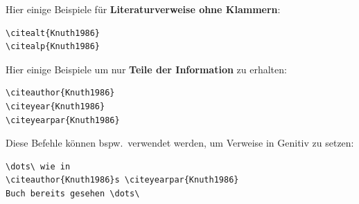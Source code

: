 \begin{frame}[fragile]

\noindent Hier einige Beispiele für \textbf{Literaturverweise ohne Klammern}:

\begin{multicols}{2}
\begin{lstlisting}
\citealt{Knuth1986}
\citealp{Knuth1986}
\end{lstlisting}
\citealt{Knuth1986}\newline
\citealp{Knuth1986}
\end{multicols}


\pause 


\noindent Hier einige Beispiele um nur \textbf{Teile der Information} zu erhalten:

\begin{multicols}{2}
\begin{lstlisting}
\citeauthor{Knuth1986}
\citeyear{Knuth1986}
\citeyearpar{Knuth1986}
\end{lstlisting}
\citeauthor{Knuth1986}\newline
\citeyear{Knuth1986}\newline
\citeyearpar{Knuth1986}
\end{multicols}

\end{frame}


\begin{frame}[fragile]

\noindent Diese Befehle können bspw.\ verwendet werden, um Verweise in Genitiv zu setzen:

\begin{lstlisting}
\dots\ wie in 
\citeauthor{Knuth1986}s \citeyearpar{Knuth1986}
Buch bereits gesehen \dots\
\end{lstlisting}

\end{frame}


